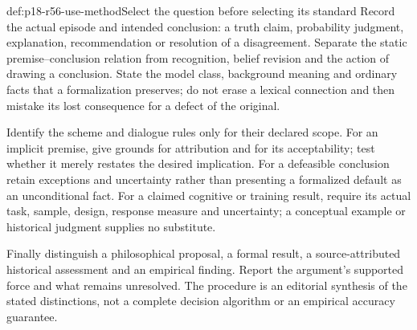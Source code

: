 \begin{hbmethod}{def:p18-r56-use-method}{Select the question before selecting its standard}
Record the actual episode and intended conclusion: a truth claim,
probability judgment, explanation, recommendation or resolution of a
disagreement. Separate the static premise--conclusion relation from
recognition, belief revision and the action of drawing a conclusion.
State the model class, background meaning and ordinary facts that a
formalization preserves; do not erase a lexical connection and then
mistake its lost consequence for a defect of the original.

Identify the scheme and dialogue rules only for their declared scope.
For an implicit premise, give grounds for attribution and for its
acceptability; test whether it merely restates the desired implication.
For a defeasible conclusion retain exceptions and uncertainty rather
than presenting a formalized default as an unconditional fact.
For a claimed cognitive or training result, require its actual task,
sample, design, response measure and uncertainty; a conceptual example
or historical judgment supplies no substitute.

Finally distinguish a philosophical proposal, a formal result, a
source-attributed historical assessment and an empirical finding.
Report the argument's supported force and what remains unresolved.
The procedure is an editorial synthesis of the stated distinctions,
not a complete decision algorithm or an empirical accuracy guarantee.
\end{hbmethod}
